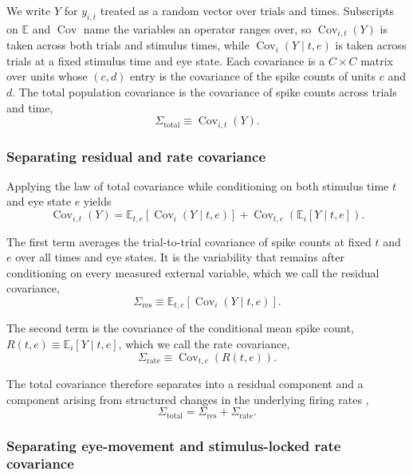 \documentclass{lite}
\newcommand{\E}{\mathbb{E}}
\renewcommand{\C}{\operatorname{Cov}}
\newcommand{\Crate}{\Sigma_{\text{rate}}}
\begin{document}
We write $Y$ for $y_{i,t}$ treated as a random vector over trials and times. Subscripts on $\E$ and $\C$ name the variables an operator ranges over, so $\C_{i,t}(Y)$ is taken across both trials and stimulus times, while $\C_{i}(Y \mid t,e)$ is taken across trials at a fixed stimulus time and eye state. Each covariance is a $C \times C$ matrix over units whose $(c,d)$ entry is the covariance of the spike counts of units $c$ and $d$. The total population covariance is the covariance of spike counts across trials and time,
\begin{equation}
\Sigma_{\text{total}} \equiv \C_{i,t}(Y).
\end{equation}

\subsubsection{Separating residual and rate covariance}

Applying the law of total covariance while conditioning on both stimulus time $t$ and eye state $e$ yields
\begin{equation}
\C_{i,t}(Y)
= \E_{t,e}\!\left[ \C_{i}(Y \mid t,e) \right]
+ \C_{t,e}\!\left( \E_{i}[Y \mid t,e] \right).
\end{equation}

The first term averages the trial-to-trial covariance of spike counts at fixed $t$ and $e$ over all times and eye states. It is the variability that remains after conditioning on every measured external variable, which we call the residual covariance,
\begin{equation}
\Sigma_{\text{res}} \equiv \E_{t,e}\!\left[ \C_{i}(Y \mid t,e) \right].
\end{equation}

The second term is the covariance of the conditional mean spike count, $R(t,e) \equiv \E_{i}[Y \mid t,e]$, which we call the rate covariance,
\begin{equation}
\Crate \equiv \C_{t,e}(R(t,e)).
\end{equation}

The total covariance therefore separates into a residual component and a component arising from structured changes in the underlying firing rates \cite{churchland2011variance},
\begin{equation}
\label{eq:law1}
\Sigma_{\text{total}} = \Sigma_{\text{res}} + \Sigma_{\text{rate}}.
\end{equation}

\subsubsection{Separating eye-movement and stimulus-locked rate covariance}
\end{document}

